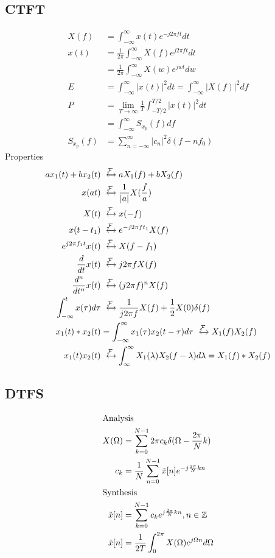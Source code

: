 \subsection{CTFT}
\begin{align*}
    X(f) &= \int_{-\infty}^\infty x(t)e^{-j2\pi ft}dt\\
    x(t) &= \frac{1}{2\pi}\int_{-\infty}^\infty X(f) e^{j2\pi ft}dt\\
    &= \frac{1}{2\pi}\int_{-\infty}^\infty X(w) e^{jwt}dw\\
    E &= \int_{-\infty}^\infty |x(t)|^2dt = \int_{-\infty}^\infty |X(f)|^2df\\
    P &= \lim_{T\rightarrow \infty}\frac{1}{T}\int_{-T/2}^{T/2}|x(t)|^2 dt\\
    &= \int_{-\infty}^\infty S_{x_p}(f)df\\
    S_{x_p}(f) &= \sum_{n=-\infty}^\infty |c_n|^2\delta(f-nf_0)
\end{align*}
Properties
\begin{align*}
    a x_1(t) + b x_2(t) & \xleftrightarrow{\mathcal{F}} a X_1(f) + b X_2(f)\\
    x(a t) &\xleftrightarrow{\mathcal{F}} \frac{1}{|a|} X(\frac{f}{a})\\
    X(t) &\xleftrightarrow{\mathcal{F}} x(-f)\\
    x(t-t_1) &\xleftrightarrow{\mathcal{F}} e^{-j2\pi ft_1}X(f)\\
    e^{j2\pi f_1 t}x(t) &\xleftrightarrow{\mathcal{F}} X(f-f_1)\\
    \frac{d}{dt}x(t) &\xleftrightarrow{\mathcal{F}} j2\pi fX(f)\\
    \frac{d^n}{dt^n}x(t) &\xleftrightarrow{\mathcal{F}} (j2\pi f)^n X(f)\\
    \int_{-\infty}^t x(\tau)d\tau &\xleftrightarrow{\mathcal{F}} \frac{1}{j2\pi f}X(f) + \frac{1}{2}X(0)\delta(f)\\
    x_1(t) * x_2(t) &= \int_{-\infty}^\infty x_1(\tau)x_2(t-\tau)d\tau \xleftrightarrow{\mathcal{F}} X_1(f)X_2(f)\\
    x_1(t) x_2(t) &\xleftrightarrow{\mathcal{F}} \int_{\infty}^\infty X_1(\lambda)X_2(f-\lambda)d\lambda = X_1(f)*X_2(f)
\end{align*}
\subsection{DTFS}
\begin{align*}
    \intertext{Analysis}
    X(\Omega) &= \sum_{k=0}^{N-1}2\pi c_k \delta(\Omega-\frac{2\pi}{N}k)\\
    c_k &= \frac{1}{N}\sum_{n=0}^{N-1}\Tilde{x}[n]e^{-j\frac{2\pi}{N} kn}\\
    \intertext{Synthesis}
    \Tilde{x}[n] &= \sum_{k=0}^{N-1} c_k e^{j\frac{2\pi}{N}kn}, n\in \mathbb{Z}\\
    \Tilde{x}[n] &= \frac{1}{2T}\int_0^{2\pi}X(\Omega)e^{j\Omega n}d\Omega
\end{align*}
